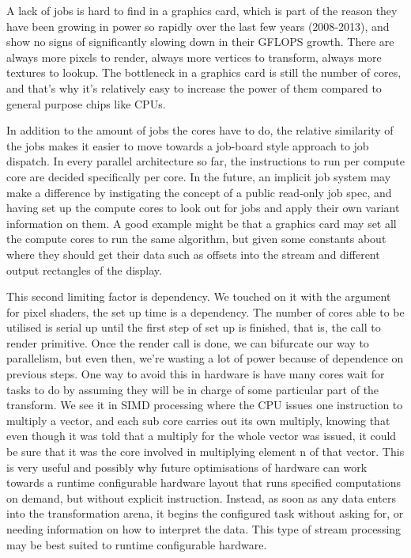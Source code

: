 A lack of jobs is hard to find in a graphics card, which is part of the reason
they have been growing in power so rapidly over the last few years (2008-2013),
and show no signs of significantly slowing down in their GFLOPS growth. There
are always more pixels to render, always more vertices to transform, always
more textures to lookup. The bottleneck in a graphics card is still the number
of cores, and that's why it's relatively easy to increase the power of them
compared to general purpose chips like CPUs.

In addition to the amount of jobs the cores have to do, the relative similarity
of the jobs makes it easier to move towards a job-board style approach to job
dispatch. In every parallel architecture so far, the instructions to run per
compute core are decided specifically per core. In the future, an implicit job
system may make a difference by instigating the concept of a public read-only
job spec, and having set up the compute cores to look out for jobs and apply
their own variant information on them. A good example might be that a graphics
card may set all the compute cores to run the same algorithm, but given some
constants about where they should get their data such as offsets into the
stream and different output rectangles of the display.

This second limiting factor is dependency. We touched on it with the argument
for pixel shaders, the set up time is a dependency. The number of cores able to
be utilised is serial up until the first step of set up is finished, that is,
the call to render primitive. Once the render call is done, we can bifurcate
our way to parallelism, but even then, we're wasting a lot of power because of
dependence on previous steps. One way to avoid this in hardware is have many
cores wait for tasks to do by assuming they will be in charge of some
particular part of the transform. We see it in SIMD processing where the CPU
issues one instruction to multiply a vector, and each sub core carries out its
own multiply, knowing that even though it was told that a multiply for the
whole vector was issued, it could be sure that it was the core involved in
multiplying element n of that vector. This is very useful and possibly why
future optimisations of hardware can work towards a runtime configurable
hardware layout that runs specified computations on demand, but without
explicit instruction. Instead, as soon as any data enters into the
transformation arena, it begins the configured task without asking for, or
needing information on how to interpret the data. This type of stream
processing may be best suited to runtime configurable hardware.

